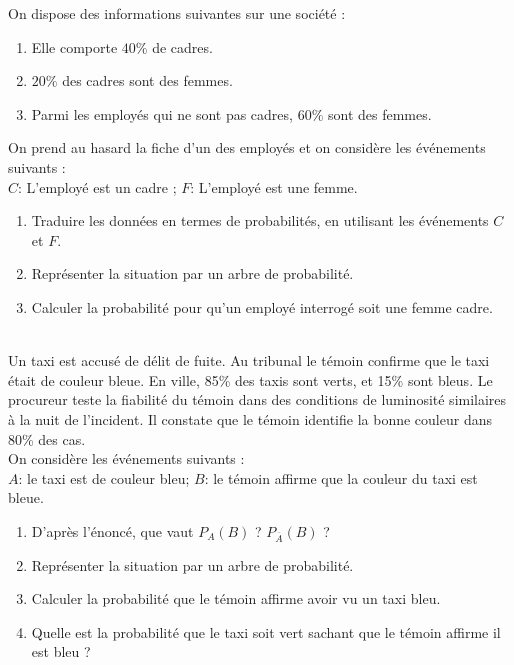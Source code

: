 \documentclass[main.tex]{subfiles}
\begin{document}
\newpage 
\begin{exercise} \label{chapter02:exercise:B10} 
	On dispose des informations suivantes sur une société :
	\begin{enumerate}[leftmargin=*, label=\textbullet]
		\item Elle comporte $40\%$ de cadres.
		\item  $20\%$ des cadres sont des femmes.
		\item Parmi les employés qui ne sont pas cadres, $60\%$ sont des femmes.
	\end{enumerate}  
	On prend au hasard la fiche d'un des employés et on considère les événements suivants :\\
	$C$: \og L'employé est un cadre \fg; \hspace*{5mm} $F$: \og L'employé est une femme\fg.
	\begin{enumerate}[leftmargin=*, label=\arabic*)]
		\item Traduire les données en termes de probabilités, en utilisant les événements $C$ et $F$.
		\item Représenter la situation par un arbre de probabilité.
		\item Calculer la probabilité pour qu'un employé interrogé soit une femme cadre.
	\end{enumerate}
\end{exercise}
\begin{exercise} \label{chapter02:exercise:B11} \hfill \\
	Un taxi est accusé de délit de fuite. Au tribunal le témoin confirme que le taxi était de couleur bleue. En ville, 85\% des taxis sont verts, et 15\% sont bleus. Le procureur teste la fiabilité du témoin dans des conditions de luminosité similaires à la nuit de l'incident. Il constate que le témoin identifie la bonne couleur dans 80\% des cas.\\
	On considère les événements suivants :\\
	$A$: \og le taxi est de couleur bleu\fg; \hspace*{5mm} $B$: \og le témoin affirme que la couleur du taxi est bleue\fg.
	\begin{enumerate}[leftmargin=*, label=\arabic*)]
		\item D'après l'énoncé, que vaut $P_A(B)$ ? $P_{\overline{A}}(B)$ ?
		\item Représenter la situation par un arbre de probabilité.
		\item Calculer la probabilité que le témoin affirme avoir vu un taxi bleu.
		\item Quelle est la probabilité que le taxi soit vert sachant que le témoin affirme il est bleu ?
	\end{enumerate}
\end{exercise}
\end{document}
